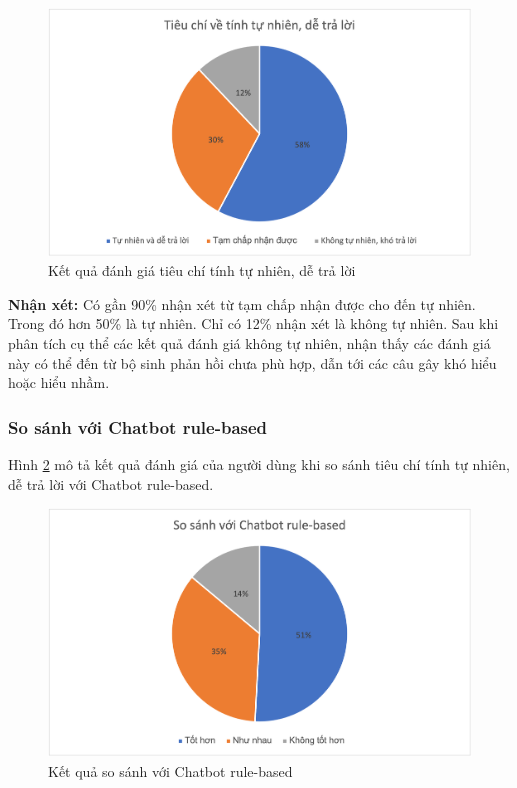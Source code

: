 \begin{figure}[ht!]
    \centering
    \includegraphics[scale=0.91]{thesis/chatbot/ketqua/img/tieuchi3.png}
    \caption{Kết quả đánh giá tiêu chí tính tự nhiên, dễ trả lời}
    \label{fig:tieuchi3}
\end{figure}

\textbf{Nhận xét:}
Có gần 90\% nhận xét từ tạm chấp nhận được cho đến tự nhiên. Trong đó
hơn 50\% là tự nhiên. Chỉ có 12\% nhận xét là không tự nhiên. Sau khi
phân tích cụ thể các kết quả đánh giá không tự nhiên, nhận thấy các
đánh giá này có thể đến từ bộ sinh phản hồi chưa phù hợp, dẫn tới các
câu gây khó hiểu hoặc hiểu nhầm.

\subsubsection{So sánh với Chatbot rule-based}
Hình \ref{fig:tieuchi32} mô tả kết quả đánh giá của người dùng khi
so sánh tiêu chí tính tự nhiên, dễ trả lời với Chatbot rule-based.

\begin{figure}[ht!]
    \centering
    \includegraphics[scale=0.91]{thesis/chatbot/ketqua/img/tieuchi3_2.png}
    \caption{Kết quả so sánh với Chatbot rule-based}
    \label{fig:tieuchi32}
\end{figure}

